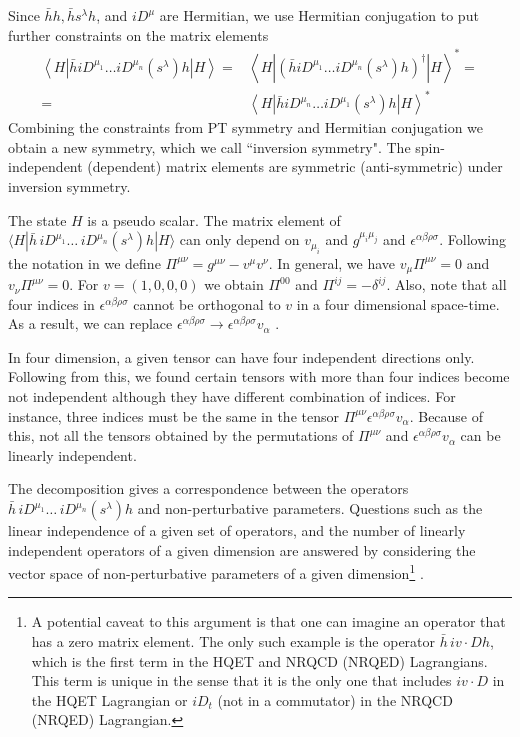 Since $\bar{h}h, \bar{h}s^{\lambda}h$, and $iD^{\mu}$ are Hermitian, we use Hermitian conjugation to put further constraints on the matrix elements
\begin{eqnarray}
\left\langle H\left|\bar{h} i D^{\mu_{1}} \ldots i D^{\mu_{n}}\left(s^{\lambda}\right) h\right| H\right\rangle= & \left\langle H\left|\left(\bar{h} i D^{\mu_{1}} \ldots i D^{\mu_{n}}\left(s^{\lambda}\right) h\right)^{\dagger}\right| H\right\rangle^{*}=\nonumber\\
=& \left\langle H\left|\bar{h} i D^{\mu_{n}} \ldots i D^{\mu_{1}}\left(s^{\lambda}\right) h\right| H\right\rangle^{*}
\end{eqnarray}
Combining the constraints from PT symmetry and Hermitian conjugation we obtain a new symmetry, which we call ``inversion symmetry". The spin-independent (dependent) matrix elements are symmetric (anti-symmetric) under inversion symmetry.\par
The state $H$ is a pseudo scalar. The matrix element of $\langle H|\bar h\, iD^{\mu_1}\dots\, iD^{\mu_n}(s^\lambda)h|H\rangle$ can only depend on $v_{\mu_i}$ and $g^{\mu_i\mu_j}$ and $\epsilon^{\alpha\beta\rho\sigma}$. Following the notation in \cite{Mannel:2010wj} we define $\Pi^{\mu \nu}=g^{\mu \nu}-v^{\mu} v^{\nu}$. In general, we have $v_{\mu}\Pi^{\mu\nu}=0$ and $v_{\nu}\Pi^{\mu\nu}=0$. For $v=(1,0,0,0)$ we obtain $\Pi^{00}$ and $\Pi^{ij}=-\delta^{ij}$. Also, note that all four indices in $\epsilon^{\alpha\beta\rho\sigma}$ cannot be orthogonal to $v$ in a four dimensional space-time. As a result, we can replace $\epsilon^{\alpha\beta\rho\sigma}\rightarrow \epsilon^{\alpha\beta\rho\sigma}v_{\alpha}$ \cite{Gunawardana:2017zix}.\par
In four dimension, a given tensor can have four independent directions only. Following from this, we found certain tensors with more than four indices become not independent although they have different combination of indices. For instance, three indices must be the same in the tensor $\Pi^{\mu\nu}\epsilon^{\alpha\beta\rho\sigma}v_{\alpha}$. Because of this, not all the tensors obtained by the permutations of $\Pi^{\mu\nu}$ and $\epsilon^{\alpha\beta\rho\sigma}v_{\alpha}$ can be linearly independent.\par
The decomposition gives a correspondence between the operators  $\bar h\, iD^{\mu_1}\dots\, iD^{\mu_n}(s^\lambda)h$ and non-perturbative parameters. Questions such as the linear independence of a given set of operators, and the number of linearly independent operators of a given dimension are answered by considering the vector space of  non-perturbative parameters of a given dimension\footnote{A potential caveat to this argument is that one can imagine an operator that has a zero matrix element. The only such example is the operator $\bar h\, iv\cdot Dh$, which is the first term in the HQET and NRQCD (NRQED) Lagrangians. This term is unique in the sense that it is the only one that includes $iv\cdot D$ in the HQET Lagrangian or $iD_t$ (not in a commutator) in the NRQCD (NRQED) Lagrangian.} \cite{Gunawardana:2017zix}.
\vspace{-0.4cm}
